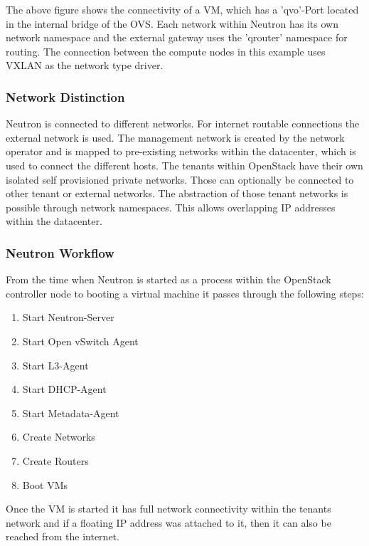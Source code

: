 The above figure shows the connectivity of a VM, which has a 'qvo'-Port located in the internal bridge of the OVS. Each network within Neutron has its own network namespace and the external gateway uses the 'qrouter' namespace for routing. The connection between the compute nodes in this example uses VXLAN as the network type driver.


\subsubsection{Network Distinction}

Neutron is connected to different networks. For internet routable connections the external network is used. The management network is created by the network operator and is mapped to pre-existing networks within the datacenter, which is used to connect the different hosts. The tenants within OpenStack have their own isolated self provisioned private networks. Those can optionally be connected to other tenant or external networks. The abstraction of those tenant networks is possible through network namespaces. This allows overlapping IP addresses within the datacenter.


\subsubsection{Neutron Workflow}

From the time when Neutron is started as a process within the OpenStack controller node to booting a virtual machine it passes through the following steps:

\begin{enumerate}
\item Start Neutron-Server
\item Start Open vSwitch Agent
\item Start L3-Agent
\item Start DHCP-Agent
\item Start Metadata-Agent
\item Create Networks
\item Create Routers
\item Boot VMs
\end{enumerate}

Once the VM is started it has full network connectivity within the tenants network and if a floating IP address was attached to it, then it can also be reached from the internet.


